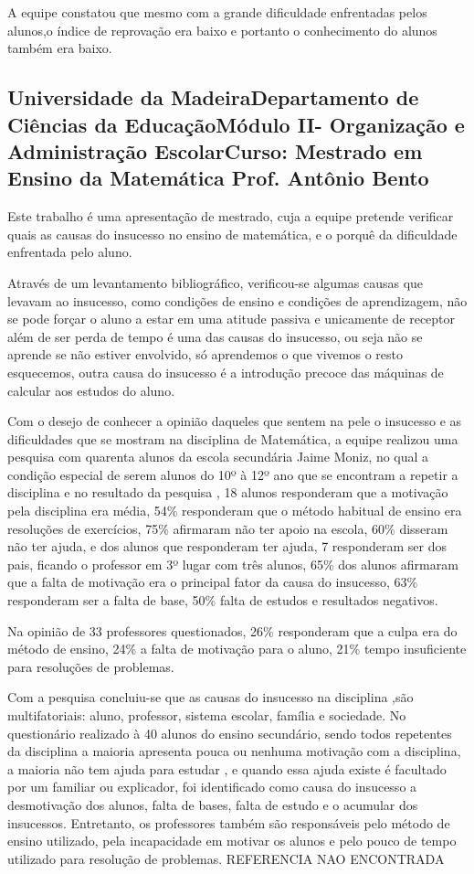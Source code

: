 \documentclass[12pt,a4paper]{article}
\begin{document}
A equipe constatou que mesmo com a grande dificuldade enfrentadas pelos alunos,o índice de reprovação era baixo e portanto o conhecimento do alunos também era baixo.\citep{santosreprovaccao}

\subsection{Universidade da MadeiraDepartamento de Ciências da EducaçãoMódulo  II- Organização e Administração EscolarCurso: Mestrado em Ensino da Matemática Prof. Antônio Bento}
Este trabalho é uma apresentação de mestrado, cuja a equipe pretende verificar quais as causas do insucesso no ensino de matemática, e o porquê da dificuldade enfrentada pelo aluno. 

Através de um levantamento bibliográfico, verificou-se algumas causas que levavam ao insucesso, como condições de ensino e condições de aprendizagem, não se pode forçar o aluno a estar em uma atitude passiva e unicamente de receptor além de ser perda de tempo é uma das causas do insucesso, ou seja não se aprende se não estiver envolvido, só aprendemos o que vivemos o resto esquecemos, outra causa do insucesso é a introdução precoce das máquinas de calcular aos estudos do aluno.

Com o desejo de conhecer a opinião daqueles que sentem na pele o insucesso e as dificuldades que se mostram na disciplina de Matemática, a equipe realizou uma pesquisa com quarenta alunos da escola secundária Jaime Moniz, no qual a condição especial de serem alunos do 10º à 12º ano que se encontram a repetir a disciplina e no resultado da pesquisa , 18 alunos responderam que a motivação pela disciplina era média, 54\% responderam que o método habitual de ensino era resoluções de exercícios, 75\% afirmaram não ter apoio na escola, 60\% disseram não ter ajuda, e dos alunos que responderam ter ajuda, 7 responderam ser dos pais, ficando o professor em 3º lugar com três alunos, 65\% dos alunos afirmaram que a falta de motivação era o principal fator da causa do insucesso, 63\%  responderam ser a falta de base, 50\% falta de estudos e resultados negativos. 

Na opinião de 33 professores questionados, 26\% responderam que a culpa era do método de ensino, 24\% a falta de motivação para o aluno, 21\% tempo insuficiente para resoluções de problemas. 

Com a pesquisa concluiu-se que as causas do insucesso na disciplina ,são multifatoriais: aluno, professor, sistema escolar, família e sociedade. No questionário realizado à 40 alunos do ensino secundário, sendo todos repetentes da disciplina a maioria apresenta pouca ou nenhuma motivação com a disciplina, a maioria não tem ajuda para estudar , e quando essa ajuda existe é facultado por um familiar ou explicador, foi identificado como causa do insucesso a desmotivação dos alunos, falta de bases, falta de estudo e o acumular dos insucessos. Entretanto, os professores também são responsáveis pelo método de ensino utilizado, pela incapacidade em motivar os alunos e pelo pouco de tempo utilizado para resolução de problemas. REFERENCIA NAO ENCONTRADA
\end{document}
